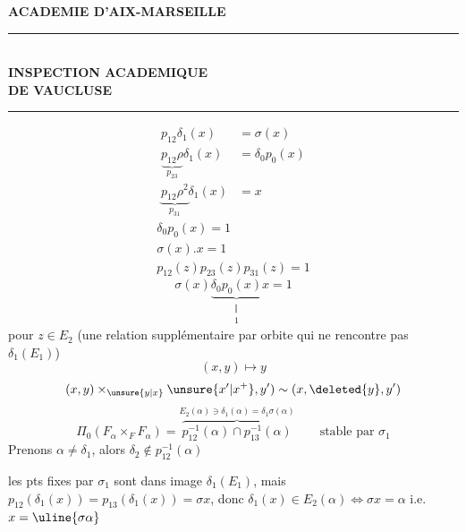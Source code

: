 \textbf{ACADEMIE D'AIX-MARSEILLE}\\
\rule{3cm}{.4pt}\\
\textbf{INSPECTION ACADEMIQUE}\\
\textbf{DE VAUCLUSE}\\
\rule{1cm}{.4pt}
\[\begin{aligned}
p_{12}\delta_1(x)&=\sigma(x)\\
\underbrace{p_{12}\rho}_{p_{23}}\delta_1(x)&=\delta_0p_0(x)\\
\underbrace{p_{12}\rho^2}_{p_{31}}\delta_1(x)&=x
\end{aligned}\]
\[\boxed{\begin{gathered}
\delta_0p_0(x)=1\\
\sigma(x).x=1\\[.5em]
p_{12}(z)p_{23}(z)p_{31}(z)=1
\end{gathered}}\]
\[\sigma(x)\underbrace{\delta_0p_0(x)}_{\substack{\Vert\\1}}x=1\]
pour $z\in E_2$ (une relation  supplémentaire par orbite  qui ne rencontre pas $\delta_1(E_1)$)
\[(x,y)\mapsto y\]
\[(x,y)\times_{\unsure{y|x}}\unsure{x'|x^+},y')\sim(x,\deleted{y},y')\]
\[\Pi_0(F_\alpha\times_F F_\alpha)=\overbrace{p_{12}^{-1}(\alpha)\cap p_{13}^{-1}(\alpha)}^{E_2(\alpha)\ni\delta_1(\alpha)=\delta_1\sigma(\alpha)}\qquad\text{stable par }\sigma_1\]
Prenons $\alpha\ne\delta_1$, alors $\delta_2\notin p_{12}^{-1}(\alpha)$

les pts fixes par $\sigma_1$ sont dans image $\delta_1(E_1)$, mais $p_{12}(\delta_1(x))=p_{13}(\delta_1(x))=\sigma x$, donc 
 $\delta_1(x)\in E_2(\alpha)\Longleftrightarrow\sigma x=\alpha$ i.e. $x=\uline{\sigma\alpha}$

